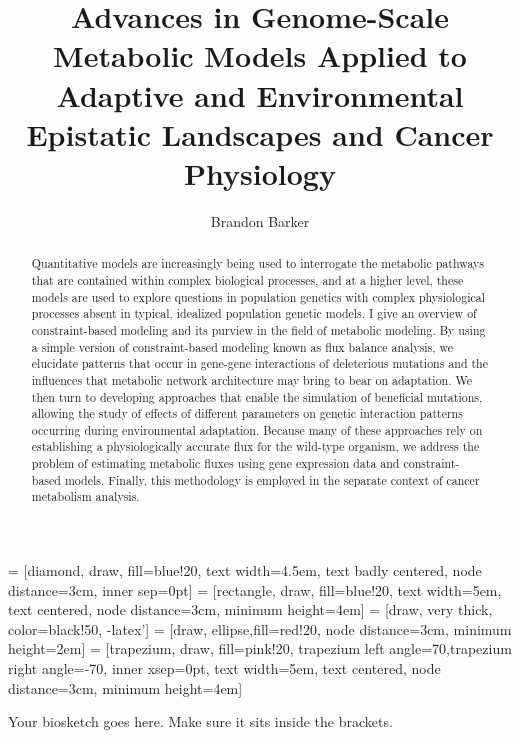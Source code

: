 \documentclass[phd,tocprelim]{cornell}
\title {Advances in Genome-Scale Metabolic Models Applied to Adaptive and Environmental Epistatic Landscapes and Cancer Physiology}
\author {Brandon Barker}
\theoremstyle{break}
\theoremstyle{empty}
\begin{document}
 = [diamond, draw, fill=blue!20,
    text width=4.5em, text badly centered, node distance=3cm, inner sep=0pt]
 = [rectangle, draw, fill=blue!20,
    text width=5em, text centered, node distance=3cm, minimum height=4em]
 = [draw, very thick, color=black!50, -latex']
 = [draw, ellipse,fill=red!20, node distance=3cm,
    minimum height=2em]
 = [trapezium, draw, fill=pink!20,
    trapezium left angle=70,trapezium right angle=-70, inner xsep=0pt,
    text width=5em, text centered, node distance=3cm, minimum height=4em]


\maketitle
\makecopyright

\begin{abstract}

Quantitative models are increasingly being used to interrogate the
metabolic pathways that are contained within complex biological
processes, and at a higher level, these models are used to explore
questions in population genetics with complex physiological processes
absent in typical, idealized population genetic models.  I give an
overview of constraint-based modeling and its purview in the field of
metabolic modeling. By using a simple version of constraint-based
modeling known as flux balance analysis, we elucidate patterns that
occur in gene-gene interactions of deleterious mutations and the
influences that metabolic network architecture may bring to bear on
adaptation. We then turn to developing approaches that enable the
simulation of beneficial mutations, allowing the study of effects of
different parameters on genetic interaction patterns occurring during
environmental adaptation. Because many of these approaches rely on
establishing a physiologically accurate flux for the wild-type
organism, we address the problem of estimating metabolic fluxes using
gene expression data and constraint-based models. Finally, this
methodology is employed in the separate context of cancer metabolism
analysis.
\end{abstract}

\begin{biosketch}
Your biosketch goes here. Make sure it sits inside
the brackets.
\end{biosketch}
\end{document}

